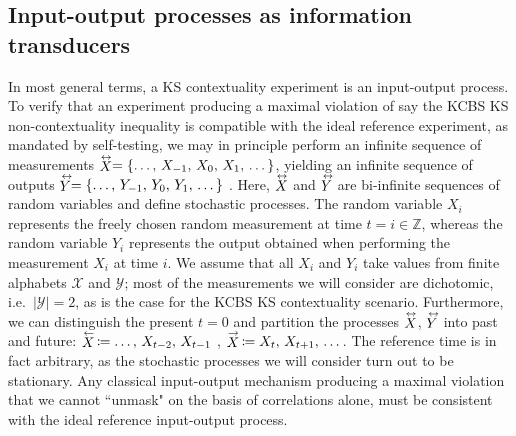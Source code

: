 \subsection{Input-output processes as information transducers}
In most general terms, a KS contextuality experiment is an input-output process. To verify that an experiment producing a maximal violation of say the KCBS KS non-contextuality inequality is compatible with the ideal reference experiment, as mandated by self-testing, we may in principle perform an infinite sequence of measurements  $\oset{\leftrightarrow}{X}=\{\dots,\thinspace X_{-1},\thinspace X_{0},\thinspace X_{1},\thinspace\dots\}$, yielding an infinite sequence of outputs $\oset{\leftrightarrow}{Y}=\{\dots,\thinspace Y_{-1},\thinspace Y_{0},\thinspace Y_{1},\thinspace \dots\}$ \cite{Cabello2018}. Here, $\oset{\leftrightarrow}{X}$ and $\oset{\leftrightarrow}{Y}$ are bi-infinite sequences of random variables and define stochastic processes. The random variable $X_{i}$ represents the freely chosen random measurement at time $t=i\in\mathbb{Z}$, whereas the random variable $Y_{i}$ represents the output obtained when performing the measurement $X_{i}$ at time $i$. We assume that all $X_i$ and $Y_i$ take values from finite alphabets $\mathcal{X}$ and $\mathcal{Y}$; most of the measurements we will consider are dichotomic, i.e.\ $\vert\mathcal{Y}\vert=2$, as is the case for the KCBS KS contextuality scenario. Furthermore, we can distinguish the present $t=0$ and partition the processes $\oset{\leftrightarrow}{X}$, $\oset{\leftrightarrow}{Y}$ into past and future: $\oset{\leftarrow}{X}\thinspace\coloneqq \dots,\thinspace X_{t-2},\thinspace X_{t-1}$ , $\oset{\rightarrow}{X}\thinspace\coloneqq X_t,\thinspace X_{t+1},\thinspace \dots$. The reference time is in fact arbitrary, as the stochastic processes we will consider turn out to be stationary. Any classical input-output mechanism producing a maximal violation that we cannot ``unmask" on the basis of correlations alone, must be consistent with the ideal reference input-output process.

